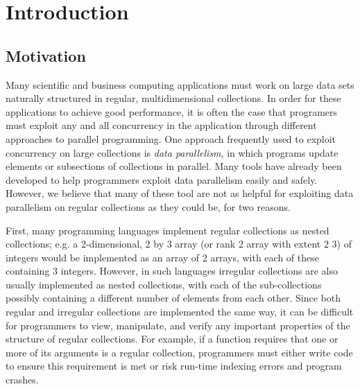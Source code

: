 \chapter{Introduction}

\section{Motivation}
Many scientific and business computing applications must work on large data sets naturally structured in regular, multidimensional collections.
In order for these applications to achieve good performance, it is often the case that programers must exploit any and all concurrency in the application through different approaches to parallel programming.
One approach frequently used to exploit concurrency on large collections is \textit{data parallelism}, in which programs update elements or subsections of collections in parallel.
Many tools have already been developed to help programmers exploit data parallelism easily and safely. %
However, we believe that many of these tool are not as helpful for exploiting data parallelism on regular collections as they could be, for two reasons.

First, many programming languages implement regular collections as nested collections;
e.g. a 2-dimensional, 2 by 3 array (or rank 2 array with extent 2 3) of integers would be implemented as an array of 2 arrays, with each of these containing 3 integers.
However, in such languages irregular collections are also usually implemented as nested collections, with each of the sub-collections possibly containing a different number of elements from each other.
Since both regular and irregular collections are implemented the same way,
it can be difficult for programmers to view, manipulate, and verify any important properties of the structure of regular collections.
For example, if a function requires that one or more of its arguments is a regular collection, programmers must either write code to ensure this requirement is met or risk run-time indexing errors and program crashes.

